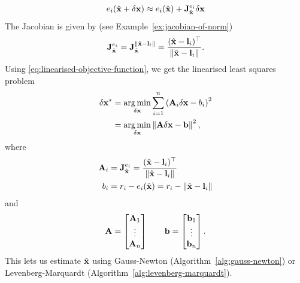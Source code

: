 \begin{example}[frametitle=Range-based localisation]
\begin{equation}
  e_i(\hat{\vecx} + \delta\vecx) \approx e_i(\hat{\vecx}) + \jac{e_i}{\hat{\vecx}} \delta\vecx
\end{equation}
The Jacobian is given by (see Example~\ref{ex:jacobian-of-norm})
\begin{equation}
  \jac{e_i}{\hat{\vecx}} = \jac{\norm{\hat{\vecx} - \vecl_i}}{\hat{\vecx}} = \frac{(\hat{\vecx} - \vecl_i)\trans}{\norm{\hat{\vecx} - \vecl_i}}.
\end{equation}
Using \eqref{eq:linearised-objective-function}, we get the linearised least squares problem
\begin{align}
  \delta\vecx^\ast &= \argmin_{\delta\vecx} \sum^n_{i=1} \left( \matA_i \delta\vecx - b_i \right)^2\\
  &= \argmin_{\delta\vecx} \norm{\matA \delta\vecx - \vecb}^2,
\end{align}
where
\begin{align}
  \matA_i &= \jac{e_i}{\hat{\vecx}} = \frac{(\hat{\vecx} - \vecl_i)\trans}{\norm{\hat{\vecx} - \vecl_i}}\\
  b_i &= r_i - e_i(\hat{\vecx}) = r_i - \norm{\hat{\vecx} - \vecl_i}
\end{align}
and
\begin{equation}
  \matA =  
  \begin{bmatrix}
    \matA_1\\
    \vdots\\
    \matA_n
  \end{bmatrix}
  \qquad
  \vecb =  
  \begin{bmatrix}
    \vecb_1\\
    \vdots\\
    \vecb_n
  \end{bmatrix}.
\end{equation}
This lets us estimate $\hat{\vecx}$ using Gauss-Newton (Algorithm~\ref{alg:gauss-newton}) or Levenberg-Marquardt (Algorithm~\ref{alg:levenberg-marquardt}).


\end{example}
